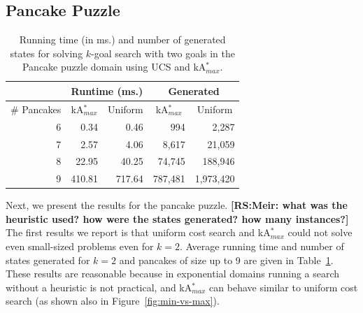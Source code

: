 \documentclass{aicom2e}
\newcommand{\kgs}{$k$-goal search}
\newcommand{\kastarmax}{kA$^*_{max}$}
\newcommand{\roni}[1]{\textbf{[RS:#1]}}
\begin{document}
\subsection{Pancake Puzzle}

\begin{table}[]
    \centering
    \begin{tabular}{|r|r|r|r|r|}
	\hline
        \multicolumn{1}{|l|}{}            & \multicolumn{2}{c|}{Runtime (ms.)}                                       & \multicolumn{2}{c|}{Generated} \\ \hline
        \multicolumn{1}{|c|}{\# Pancakes} & \multicolumn{1}{c}{\kastarmax{}} & \multicolumn{1}{c|}{Uniform} & \multicolumn{1}{c}{\kastarmax{}} & \multicolumn{1}{c|}{Uniform} \\ \hline
        6                               & 0.34                                      & 0.46                        & 994                                       & 2,287                       \\
        7                               & 2.57                                      & 4.06                        & 8,617                                     & 21,059                      \\
        8                               & 22.95                                     & 40.25                       & 74,745                                    & 188,946                     \\
        9                               & 410.81                                    & 717.64                      & 787,481                                   &
        1,973,420\\
        \hline
    \end{tabular}
    \caption{Running time (in ms.) and number of generated states for solving \kgs{} with two goals 
    	in the Pancake puzzle domain using UCS and \kastarmax{}.}
\label{tab:pancake-max-uniform}
\end{table}

Next, we present the results for the pancake puzzle. 
\roni{Meir: what was the heuristic used? how were the states generated? how many instances?}
The first results we report is that uniform cost search and \kastarmax{} 
could not solve even small-sized problems even for $k=2$. Average running time and number of states generated  for $k=2$ and pancakes of size up to 9 are given in Table~\ref{tab:pancake-max-uniform}. These results are reasonable because in exponential domains running a search without a heuristic is not practical, and \kastarmax{} can behave similar to uniform cost search (as shown also in Figure~\ref{fig:min-vs-max}). 
\end{document}
